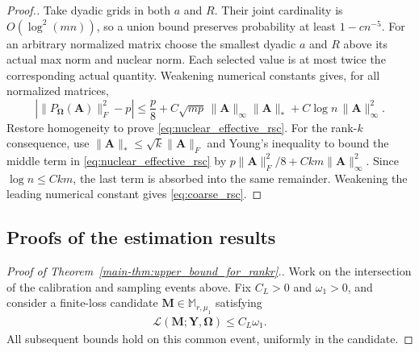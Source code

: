 \documentclass[numsec,webpdf,modern,large,namedate]{oup-authoring-template}
\theoremstyle{plain}
\theoremstyle{remark}
\newcommand{\M}{\bm{M}}
\newcommand{\Y}{\bm{Y}}
\newcommand{\bOmega}{\bm{\Omega}}
\newif\ifmarkchanges
\newenvironment{revision}{\begingroup\ifmarkchanges\color{red}\fi}{\endgroup}
\begin{document}
\begin{revision}
\begin{proof}[Proof.]
Take dyadic grids in both $a$ and $R$.  Their joint cardinality is
$O(\log^2(mn))$, so a union bound preserves probability at least
$1-cn^{-5}$.  For an arbitrary normalized matrix choose the smallest dyadic
$a$ and $R$ above its actual max norm and nuclear norm.  Each selected value
is at most twice the corresponding actual quantity.  Weakening numerical
constants gives, for all normalized matrices,
\[
 \left|
 \|P_{\bOmega}(\bm A)\|_F^2-p
 \right|
 \le
 \frac p8
 +
 C\sqrt{mp}\,
 \|\bm A\|_\infty\|\bm A\|_*
 +
 C\log n\,\|\bm A\|_\infty^2.
\]
Restore homogeneity to prove
\eqref{eq:nuclear_effective_rsc}.
For the rank-$k$ consequence, use $\|\bm A\|_*\le\sqrt k\|\bm A\|_F$
and Young's inequality to bound the middle term in
\eqref{eq:nuclear_effective_rsc} by
$p\|\bm A\|_F^2/8+Ckm\|\bm A\|_\infty^2$.
Since $\log n\le Ckm$, the last term is absorbed into the same remainder.
Weakening the leading numerical constant gives \eqref{eq:coarse_rsc}.
\end{proof}

\subsection{Proofs of the estimation results}
\begin{proof}[Proof of Theorem~\ref{main-thm:upper_bound_for_rankr}.]
Work on the intersection of the calibration and sampling events above.
Fix $C_L>0$ and $\omega_1>0$, and consider a finite-loss
candidate $\M\in\mathbb M_{r,\mu_1}$ satisfying
\begin{align}
 \mathcal L(\M;\Y,\bOmega)\le C_L\omega_1.
 \label{eq:factor_low_loss_condition}
\end{align}
All subsequent bounds hold on this common event, uniformly in the candidate.


\end{proof}
\end{revision}
\end{document}
